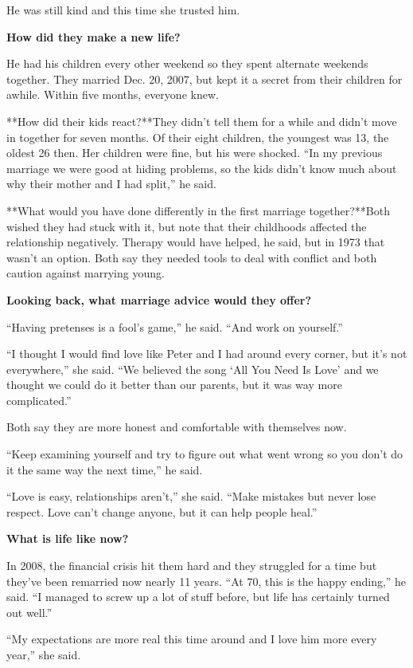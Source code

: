 He was still kind and this time she trusted him.

\textbf{How did they make a new life?}

He had his children every other weekend so they spent alternate weekends
together. They married Dec. 20, 2007, but kept it a secret from their
children for awhile. Within five months, everyone knew.

**How did their kids react?**They didn't tell them for a while and
didn't move in together for seven months. Of their eight children, the
youngest was 13, the oldest 26 then. Her children were fine, but his
were shocked. ``In my previous marriage we were good at hiding problems,
so the kids didn't know much about why their mother and I had split,''
he said.

**What would you have done differently in the first marriage
together?**Both wished they had stuck with it, but note that their
childhoods affected the relationship negatively. Therapy would have
helped, he said, but in 1973 that wasn't an option. Both say they needed
tools to deal with conflict and both caution against marrying young.

\textbf{Looking back, what marriage advice would they offer?}

``Having pretenses is a fool's game,'' he said. ``And work on
yourself.''

``I thought I would find love like Peter and I had around every corner,
but it's not everywhere,'' she said. ``We believed the song `All You
Need Is Love' and we thought we could do it better than our parents, but
it was way more complicated.''

Both say they are more honest and comfortable with themselves now.

``Keep examining yourself and try to figure out what went wrong so you
don't do it the same way the next time,'' he said.

``Love is easy, relationships aren't,'' she said. ``Make mistakes but
never lose respect. Love can't change anyone, but it can help people
heal.''

\textbf{What is life like now?}

In 2008, the financial crisis hit them hard and they struggled for a
time but they've been remarried now nearly 11 years. ``At 70, this is
the happy ending,'' he said. ``I managed to screw up a lot of stuff
before, but life has certainly turned out well.''

``My expectations are more real this time around and I love him more
every year,'' she said.

